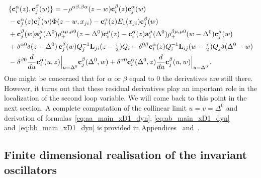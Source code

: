 \begin{equation}
\label{eq:bb_main_xD1_dyn}
\begin{split}
&\{\mathbf{c}_i^\alpha(z),\mathbf{c}_j^\beta(w)\} =-\rho^{\alpha \beta, \beta \alpha}(z-w)
\mathbf{c}_i^\beta(z) \mathbf{c}_j^\alpha(w) \\
&- \mathbf{c}_j^\alpha(z) \mathbf{c}_i^\beta(w)   \Phi(z-w, x_{ji})   - \mathbf{c}_i^\alpha(z) E_1(x_{ji})    \mathbf{c}_j^\beta(w) \\
&+\mathbf{c}_j^\beta(w)  \mathbf{a}_j^\mu(\Delta^0) \rho_+^{\alpha \mu, \mu 0}(z-\Delta^0) \mathbf{c}_i^\mu(z)  -\mathbf{c}_i^\alpha(z)  \mathbf{a}_i^\mu(\Delta^0)  \rho_+^{\beta \mu, \mu 0}(w-\Delta^0) \mathbf{c}_j^\mu(w)\\
&+\delta^{\alpha0}  \delta(z-\Delta^0)  \, \mathbf{c}_j^\beta(w) Q^{-1}_j    \mathbf{L}_{ji}(z-\tfrac{\tau}{2}) Q_i -\delta^{0\beta} \mathbf{c}_i^\alpha(z) Q^{-1}_i \mathbf{L}_{ij}(w-\tfrac{\tau}{2}) Q_j \delta(\Delta^0-w)\\
&- \delta^{\beta0}\frac{d}{du}\mathbf{c}_i^\alpha(u,z) \Bigl|_{u=\Delta^0} \mathbf{c}_j^\beta(\Delta^0,w)+ \delta^{\alpha0} \mathbf{c}_i^\alpha(\Delta^0,z) \frac{d}{du}\mathbf{c}_j^\beta(u,w) \Bigl|_{u=\Delta^0} \,.
\end{split}
\end{equation}
One might be concerned that for $\alpha$ or $\beta$ equal to $0$ the derivatives are still there. However, it turns out that these residual derivatives play an important role in the localization of the second loop variable. We will come back to this point in the next section.
A complete computation of the collinear limit $u=v=\Delta^0$ and derivation of formulas~\eqref{eq:aa_main_xD1_dyn}, \eqref{eq:ab_main_xD1_dyn} and~\eqref{eq:bb_main_xD1_dyn} is provided in Appendices~ and~.



\subsection{Finite dimensional realisation of the invariant oscillators}
\label{sec:finite_dim}

